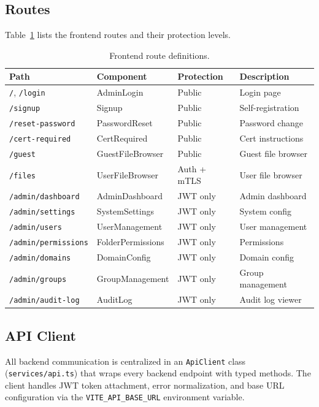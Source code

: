 \documentclass[12pt,letterpaper]{report}
\begin{document}
\subsection{Routes}

Table~\ref{tab:frontend-routes} lists the frontend routes and their protection levels.

\begin{table}[ht]
\centering
\caption{Frontend route definitions.}
\label{tab:frontend-routes}
\small
\begin{tabular}{llll}
\hline
\textbf{Path} & \textbf{Component} & \textbf{Protection} & \textbf{Description} \\
\hline
\texttt{/}, \texttt{/login} & AdminLogin & Public & Login page \\
\texttt{/signup} & Signup & Public & Self-registration \\
\texttt{/reset-password} & PasswordReset & Public & Password change \\
\texttt{/cert-required} & CertRequired & Public & Cert instructions \\
\texttt{/guest} & GuestFileBrowser & Public & Guest file browser \\
\texttt{/files} & UserFileBrowser & Auth + mTLS & User file browser \\
\texttt{/admin/dashboard} & AdminDashboard & JWT only & Admin dashboard \\
\texttt{/admin/settings} & SystemSettings & JWT only & System config \\
\texttt{/admin/users} & UserManagement & JWT only & User management \\
\texttt{/admin/permissions} & FolderPermissions & JWT only & Permissions \\
\texttt{/admin/domains} & DomainConfig & JWT only & Domain config \\
\texttt{/admin/groups} & GroupManagement & JWT only & Group management \\
\texttt{/admin/audit-log} & AuditLog & JWT only & Audit log viewer \\
\hline
\end{tabular}
\end{table}

\subsection{API Client}

All backend communication is centralized in an \texttt{ApiClient} class (\texttt{services/api.ts}) that wraps every backend endpoint with typed methods. The client handles JWT token attachment, error normalization, and base URL configuration via the \texttt{VITE\_API\_BASE\_URL} environment variable.
\end{document}
